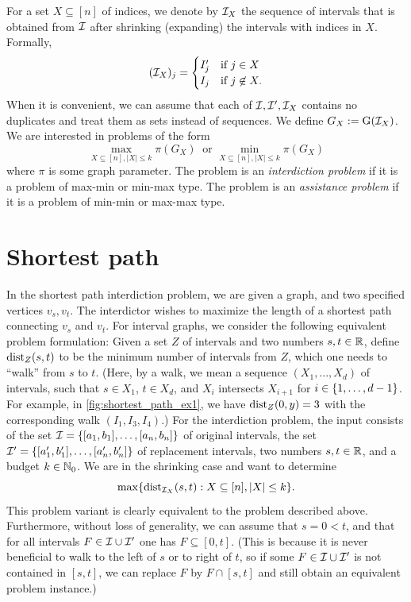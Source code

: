 For a set $X \subseteq [n]$ of indices, we denote by $\mathcal{I}_X$ the sequence of intervals that is obtained from  $\mathcal{I}$ after shrinking (expanding) the intervals with indices in $X$. Formally, 
\[(\mathcal{I}_X)_j = \begin{cases} I'_j & \text{if }j \in X \\
I_j & \text{if } j \not\in X. \end{cases}\]
When it is convenient, we can assume that each of $\mathcal{I}, \mathcal{I}', \mathcal{I}_X$ contains no duplicates and treat them as sets instead of sequences. We define $G_X := \operatorname{G}(\mathcal{I}_X)$. We are interested in problems of the form 
\[ \max_{X \subseteq [n], |X| \leq k} \pi(G_X) \ \text{ or } \min_{X \subseteq [n], |X| \leq k} \pi(G_X)\]
where $\pi$ is some graph parameter. The problem is an \emph{interdiction problem} if it is a problem of max-min or min-max type. The problem is an \emph{assistance problem} if it is a problem of min-min or max-max type.

\section{Shortest path}

In the shortest path interdiction problem, we are given a graph, and two specified vertices $v_s, v_t$. The interdictor wishes to maximize the length of a shortest path connecting $v_s$ and $v_t$. For interval graphs, we consider the following equivalent problem formulation: 
Given a set $Z$ of intervals and two numbers $s, t \in \mathbb{R}$, define $\operatorname{\text{dist}}_Z(s, t)$ to be the minimum number of intervals from $Z$, which one needs to \enquote{walk} from $s$ to $t$. (Here, by a walk, we mean a sequence $(X_1, \dots, X_d)$ of intervals, such that $s \in X_1$, $t \in X_d$, and $X_i$ intersects $X_{i+1}$ for $i \in \{ 1, \ldots, d-1 \}$. For example, in \cref{fig:shortest_path_ex1}, we have $\operatorname{\text{dist}}_Z(0, y) = 3$ with the corresponding walk $(I_1,I_3,I_4)$.) 
For the interdiction problem, 
the input consists of the set $\mathcal{I} = \{ [a_1,b_1], \dots, [a_n, b_n] \}$ of original intervals, the set 
$\mathcal{I}' = \{ [a'_1,b'_1], \dots, [a'_n, b'_n] \}$ of replacement intervals, two numbers $s, t \in \mathbb{R}$, and a budget $k \in \mathbb{N}_0$. We are in the shrinking case and want to determine 
\[\max\{ \operatorname{\text{dist}}_{\mathcal{I}_X}(s, t) : X \subseteq [n], |X| \leq k \}.\] This problem variant is clearly equivalent to the problem described above. Furthermore, without loss of generality, we can assume that $s = 0 < t$, and that for all intervals $F \in \mathcal{I} \cup \mathcal{I}'$ one has $F \subseteq [0, t]$. (This is because it is never beneficial to walk to the left of $s$ or to right of $t$, so if some $F \in \mathcal{I} \cup \mathcal{I}'$ is not contained in $[s, t]$, we can replace $F$ by $F \cap [s, t]$ and still obtain an equivalent problem instance.) 


